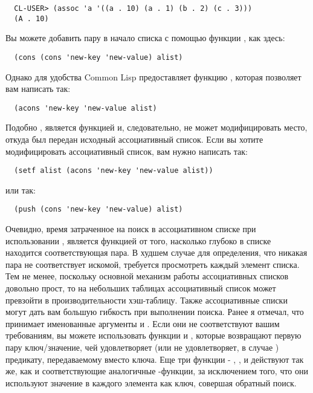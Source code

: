 \begin{verbatim}
  CL-USER> (assoc 'a '((a . 10) (a . 1) (b . 2) (c . 3)))
  (A . 10)
\end{verbatim}

Вы можете добавить пару в начало списка с помощью функции , как здесь:

\begin{verbatim}
  (cons (cons 'new-key 'new-value) alist)
\end{verbatim}

Однако для удобства Common Lisp предоставляет функцию , которая позволяет вам
написать так:

\begin{verbatim}
  (acons 'new-key 'new-value alist)
\end{verbatim}

Подобно ,  является функцией и, следовательно, не может
модифицировать место, откуда был передан исходный ассоциативный список. Если вы хотите
модифицировать ассоциативный список, вам нужно написать так:

\begin{verbatim}
  (setf alist (acons 'new-key 'new-value alist))
\end{verbatim}

или так:

\begin{verbatim}
  (push (cons 'new-key 'new-value) alist)
\end{verbatim}

Очевидно, время затраченное на поиск в ассоциативном списке при использовании
, является функцией от того, насколько глубоко в списке находится
соответствующая пара. В худшем случае для определения, что никакая пара не соответствует
искомой,  требуется просмотреть каждый элемент списка. Тем не менее, поскольку
основной механизм работы ассоциативных списков довольно прост, то на небольших таблицах
ассоциативный список может превзойти в производительности хэш-таблицу.  Также
ассоциативные списки могут дать вам большую гибкость при выполнении поиска. Ранее я
отмечал, что  принимает именованные аргументы  и . Если
они не соответствуют вашим требованиям, вы можете использовать функции  и
, которые возвращают первую пару ключ/значение, чей 
удовлетворяет (или не удовлетворяет, в случае ) предикату,
передаваемому вместо ключа. Еще три функции - , , и
 действуют так же, как и соответствующие аналогичные
-функции, за исключением того, что они используют значение в 
каждого элемента как ключ, совершая обратный поиск.

